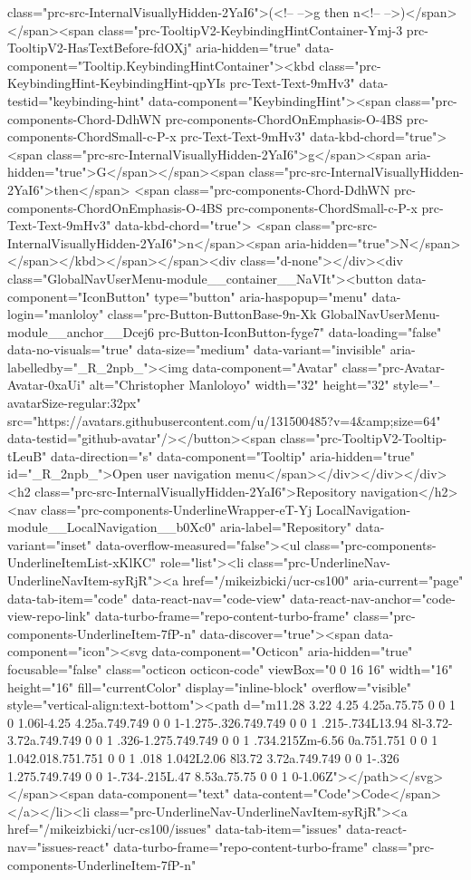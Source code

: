 class="prc-src-InternalVisuallyHidden-2YaI6">(<!-- -->g then n<!-- -->)</span></span><span class="prc-TooltipV2-KeybindingHintContainer-Ymj-3 prc-TooltipV2-HasTextBefore-fdOXj" aria-hidden="true" data-component="Tooltip.KeybindingHintContainer"><kbd class="prc-KeybindingHint-KeybindingHint-qpYIs prc-Text-Text-9mHv3" data-testid="keybinding-hint" data-component="KeybindingHint"><span class="prc-components-Chord-DdhWN prc-components-ChordOnEmphasis-O-4BS prc-components-ChordSmall-c-P-x prc-Text-Text-9mHv3" data-kbd-chord="true"> <span class="prc-src-InternalVisuallyHidden-2YaI6">g</span><span aria-hidden="true">G</span></span><span class="prc-src-InternalVisuallyHidden-2YaI6">then</span> <span class="prc-components-Chord-DdhWN prc-components-ChordOnEmphasis-O-4BS prc-components-ChordSmall-c-P-x prc-Text-Text-9mHv3" data-kbd-chord="true"> <span class="prc-src-InternalVisuallyHidden-2YaI6">n</span><span aria-hidden="true">N</span></span></kbd></span></span><div class="d-none"></div><div class="GlobalNavUserMenu-module__container__NaVIt"><button data-component="IconButton" type="button" aria-haspopup="menu" data-login="manloloy" class="prc-Button-ButtonBase-9n-Xk GlobalNavUserMenu-module__anchor__Dcej6 prc-Button-IconButton-fyge7" data-loading="false" data-no-visuals="true" data-size="medium" data-variant="invisible" aria-labelledby="_R_2npb_"><img data-component="Avatar" class="prc-Avatar-Avatar-0xaUi" alt="Christopher Manloloyo" width="32" height="32" style="--avatarSize-regular:32px" src="https://avatars.githubusercontent.com/u/131500485?v=4&amp;size=64" data-testid="github-avatar"/></button><span class="prc-TooltipV2-Tooltip-tLeuB" data-direction="s" data-component="Tooltip" aria-hidden="true" id="_R_2npb_">Open user navigation menu</span></div></div></div><h2 class="prc-src-InternalVisuallyHidden-2YaI6">Repository navigation</h2><nav class="prc-components-UnderlineWrapper-eT-Yj LocalNavigation-module__LocalNavigation__b0Xc0" aria-label="Repository" data-variant="inset" data-overflow-measured="false"><ul class="prc-components-UnderlineItemList-xKlKC" role="list"><li class="prc-UnderlineNav-UnderlineNavItem-syRjR"><a href="/mikeizbicki/ucr-cs100" aria-current="page" data-tab-item="code" data-react-nav="code-view" data-react-nav-anchor="code-view-repo-link" data-turbo-frame="repo-content-turbo-frame" class="prc-components-UnderlineItem-7fP-n" data-discover="true"><span data-component="icon"><svg data-component="Octicon" aria-hidden="true" focusable="false" class="octicon octicon-code" viewBox="0 0 16 16" width="16" height="16" fill="currentColor" display="inline-block" overflow="visible" style="vertical-align:text-bottom"><path d="m11.28 3.22 4.25 4.25a.75.75 0 0 1 0 1.06l-4.25 4.25a.749.749 0 0 1-1.275-.326.749.749 0 0 1 .215-.734L13.94 8l-3.72-3.72a.749.749 0 0 1 .326-1.275.749.749 0 0 1 .734.215Zm-6.56 0a.751.751 0 0 1 1.042.018.751.751 0 0 1 .018 1.042L2.06 8l3.72 3.72a.749.749 0 0 1-.326 1.275.749.749 0 0 1-.734-.215L.47 8.53a.75.75 0 0 1 0-1.06Z"></path></svg></span><span data-component="text" data-content="Code">Code</span></a></li><li class="prc-UnderlineNav-UnderlineNavItem-syRjR"><a href="/mikeizbicki/ucr-cs100/issues" data-tab-item="issues" data-react-nav="issues-react" data-turbo-frame="repo-content-turbo-frame" class="prc-components-UnderlineItem-7fP-n" 